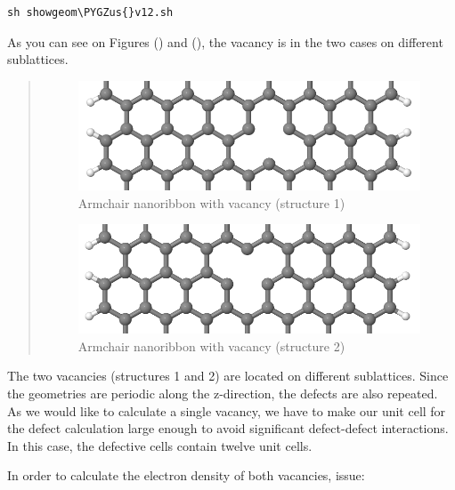 \documentclass[a4paper,11pt,english]{sphinxmanual}
\def\PYGZus{\char`\_}
\begin{document}
{{\begin{Verbatim}[commandchars=\\\{\}]
sh showgeom\PYGZus{}v12.sh
\end{Verbatim}

As you can see on Figures {\hyperref[electstruct:fig-armchair-v1-geo]{\emph{}}} () and
{\hyperref[electstruct:fig-armchair-v2-geo]{\emph{}}} (), the vacancy is in the two cases on
different sublattices.
\begin{quote}
\begin{figure}[htbp]
\centering
\capstart

\includegraphics[width=0.700\linewidth]{armchair-v1-geo.png}
\caption{Armchair nanoribbon with vacancy (structure 1)}\label{electstruct:fig-armchair-v1-geo}\end{figure}
\begin{figure}[htbp]
\centering
\capstart

\includegraphics[width=0.700\linewidth]{armchair-v2-geo.png}
\caption{Armchair nanoribbon with vacancy (structure 2)}\label{electstruct:fig-armchair-v2-geo}\end{figure}
\end{quote}

The two vacancies (structures 1 and 2) are located on different
sublattices. Since the geometries are periodic along the z-direction,
the defects are also repeated. As we would like to calculate a single
vacancy, we have to make our unit cell for the defect calculation
large enough to avoid significant defect-defect interactions. In this
case, the defective cells contain twelve unit cells.

In order to calculate the electron density of both vacancies, issue:

}}
\end{document}
